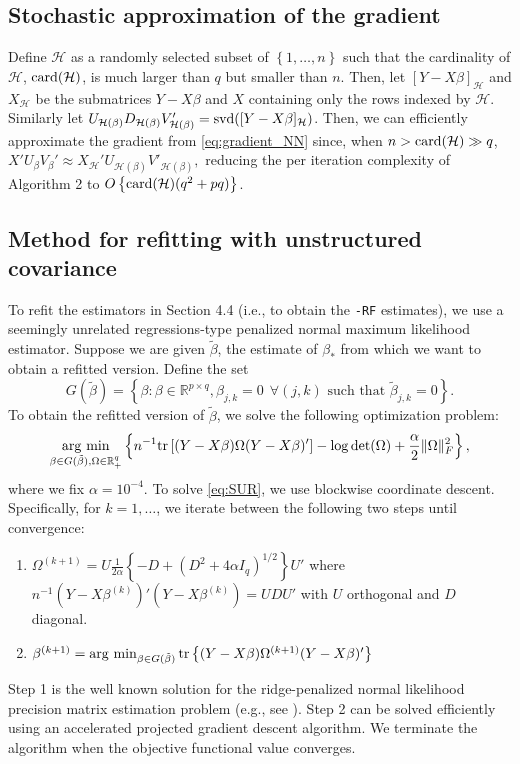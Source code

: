 \documentclass[12pt]{article}
\newcommand{\argmin}{\operatorname*{arg \ min}}
\begin{document}
\subsection{Stochastic approximation of the gradient}
Define $\mathcal{H}$ as a randomly selected subset of $\left\{1, \dots, n\right\}$ such that the cardinality of $\mathcal{H}$, ${\rm card}(\mathcal{H})$, is much larger than $q$ but smaller than $n$. Then, let $[Y - X\beta]_{\mathcal{H}}$ and $X_\mathcal{H}$ be the submatrices $Y - X \beta$ and $X$ containing only the rows indexed by $\mathcal{H}$. Similarly let $U_{\mathcal{H}(\beta)} D_{\mathcal{H}(\beta)} V'_{\mathcal{H}(\beta)} = {\rm svd}([Y - X\beta]_{\mathcal{H}})$. Then, we can efficiently approximate the gradient from \eqref{eq:gradient_NN} since, when $n > {\rm card}(\mathcal{H}) \gg q$,
$X'U_\beta V_\beta' \approx X_{\mathcal{H}}'U_{\mathcal{H}(\beta)}V'_{\mathcal{H}(\beta)},$ reducing the per iteration complexity of Algorithm 2 to $O\left\{{\rm card}(\mathcal{H})(q^2 + pq)\right\}$.

\subsection{Method for refitting with unstructured covariance}
To refit the estimators in Section 4.4 (i.e., to obtain the \texttt{-RF} estimates), we use a seemingly unrelated regressions-type penalized normal maximum likelihood estimator. Suppose we are given $\tilde{\beta}$, the estimate of $\beta_*$ from which we want to obtain a refitted version. Define the set $$G(\tilde{\beta}) = \left\{ \beta: \beta \in \mathbb{R}^{p \times q}, \beta_{j,k} = 0 \hspace{5pt} \forall (j,k) \text{ such that } \tilde{\beta}_{j,k} = 0 \right\}.$$ To obtain the refitted version of $\tilde{\beta}$, we solve the following optimization problem: 
\begin{equation}\label{eq:SUR} \argmin_{\beta \in G(\tilde{\beta}), \Omega \in \mathbb{R}^q_+} \left\{n^{-1}{\rm tr}\left[ (Y - X\beta)\Omega(Y - X\beta)' \right] - \log{\rm det}(\Omega) + \frac{\alpha}{2}\|\Omega\|_F^2 \right\},
\end{equation}
where we fix $\alpha = 10^{-4}$. To solve \eqref{eq:SUR}, we use blockwise coordinate descent. Specifically, for $k=1, \dots$, we iterate between the following two steps until convergence: 
\begin{enumerate}
\item $\Omega^{(k+1)} = U \frac{1}{2 \alpha} \left\{ - D + (D^2 + 4\alpha I_q)^{1/2}\right\} U'$ where $n^{-1}(Y - X\beta^{(k)})'(Y - X\beta^{(k)}) = U D U'$ with $U$ orthogonal and $D$ diagonal. 
\item $\beta^{(k+1)} = \argmin_{\beta \in G(\tilde{\beta})} {\rm tr}\left\{(Y - X \beta) \Omega^{(k+1)}(Y - X\beta)' \right\}$
\end{enumerate}
Step 1 is the well known solution for the ridge-penalized normal likelihood precision matrix estimation problem (e.g., see \citet{witten2009covariance}). Step 2 can be solved efficiently using an accelerated projected gradient descent algorithm. We terminate the algorithm when the objective functional value converges. 
\end{document}
